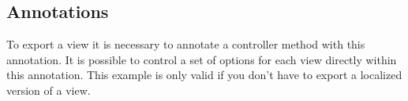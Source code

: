 \subsection{Annotations}

 {
    To export a view it is necessary to annotate a controller method with this annotation. It is possible to control a set of options for each view directly within this annotation. This example is only valid if you don't have to export a localized version of a view.

}

 {



}